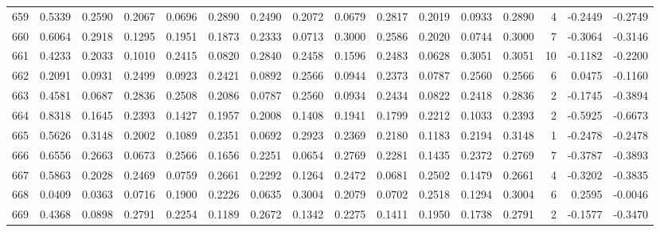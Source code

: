\begin{tabular}{lrrrrrrrrrrrrrrr}
659 &      0.5339 &  0.2590 &  0.2067 &  0.0696 &  0.2890 &  0.2490 &  0.2072 &  0.0679 &  0.2817 &  0.2019 &   0.0933 &     0.2890 &      4 &                   -0.2449 &                    -0.2749 \\
660 &      0.6064 &  0.2918 &  0.1295 &  0.1951 &  0.1873 &  0.2333 &  0.0713 &  0.3000 &  0.2586 &  0.2020 &   0.0744 &     0.3000 &      7 &                   -0.3064 &                    -0.3146 \\
661 &      0.4233 &  0.2033 &  0.1010 &  0.2415 &  0.0820 &  0.2840 &  0.2458 &  0.1596 &  0.2483 &  0.0628 &   0.3051 &     0.3051 &     10 &                   -0.1182 &                    -0.2200 \\
662 &      0.2091 &  0.0931 &  0.2499 &  0.0923 &  0.2421 &  0.0892 &  0.2566 &  0.0944 &  0.2373 &  0.0787 &   0.2560 &     0.2566 &      6 &                    0.0475 &                    -0.1160 \\
663 &      0.4581 &  0.0687 &  0.2836 &  0.2508 &  0.2086 &  0.0787 &  0.2560 &  0.0934 &  0.2434 &  0.0822 &   0.2418 &     0.2836 &      2 &                   -0.1745 &                    -0.3894 \\
664 &      0.8318 &  0.1645 &  0.2393 &  0.1427 &  0.1957 &  0.2008 &  0.1408 &  0.1941 &  0.1799 &  0.2212 &   0.1033 &     0.2393 &      2 &                   -0.5925 &                    -0.6673 \\
665 &      0.5626 &  0.3148 &  0.2002 &  0.1089 &  0.2351 &  0.0692 &  0.2923 &  0.2369 &  0.2180 &  0.1183 &   0.2194 &     0.3148 &      1 &                   -0.2478 &                    -0.2478 \\
666 &      0.6556 &  0.2663 &  0.0673 &  0.2566 &  0.1656 &  0.2251 &  0.0654 &  0.2769 &  0.2281 &  0.1435 &   0.2372 &     0.2769 &      7 &                   -0.3787 &                    -0.3893 \\
667 &      0.5863 &  0.2028 &  0.2469 &  0.0759 &  0.2661 &  0.2292 &  0.1264 &  0.2472 &  0.0681 &  0.2502 &   0.1479 &     0.2661 &      4 &                   -0.3202 &                    -0.3835 \\
668 &      0.0409 &  0.0363 &  0.0716 &  0.1900 &  0.2226 &  0.0635 &  0.3004 &  0.2079 &  0.0702 &  0.2518 &   0.1294 &     0.3004 &      6 &                    0.2595 &                    -0.0046 \\
669 &      0.4368 &  0.0898 &  0.2791 &  0.2254 &  0.1189 &  0.2672 &  0.1342 &  0.2275 &  0.1411 &  0.1950 &   0.1738 &     0.2791 &      2 &                   -0.1577 &                    -0.3470 \\

\end{tabular}
